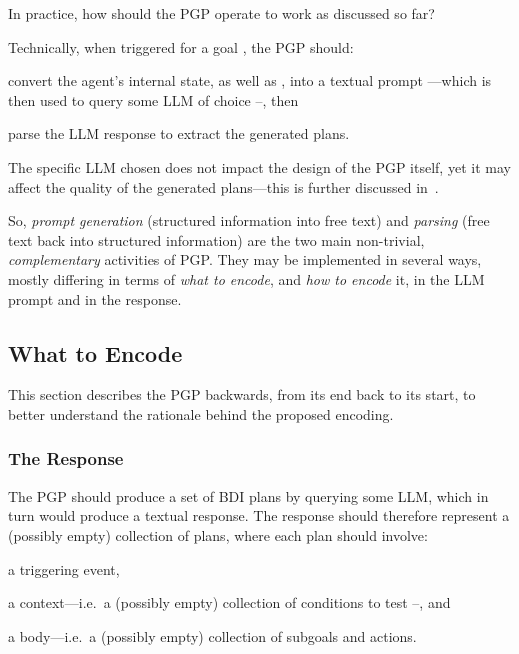 \documentclass[12pt,a4paper,openright,twoside]{book}
\begin{document}
In practice, how should the \ac{PGP} operate to work as discussed so far?

Technically, when triggered for a goal , the \ac{PGP} should:
%
\begin{inlinelist}
    \item convert the agent's internal state, as well as , into a textual prompt
   ---which is then used to query some \ac{LLM} of choice --,
    then
    \item parse the \ac{LLM} response to extract the generated plans.
\end{inlinelist}
%
The specific \ac{LLM} chosen does not impact the design of the \ac{PGP} itself, yet it may affect the quality of the generated plans---this is further discussed in~.

So, \emph{prompt generation} (structured information into free text) and  \emph{parsing} (free text back into structured information) are the two main non-trivial, \emph{complementary} activities of \ac{PGP}.
%
They may be implemented in several ways, mostly differing in terms of \emph{what to encode}, and \emph{how to encode} it, in the \ac{LLM} prompt and in the response.

\subsection{What to Encode}\label{sec:pgp-encoding}

This section describes the \ac{PGP} backwards, from its end back to its start, to better understand the rationale behind the proposed encoding.

\subsubsection{The Response}
%
The \ac{PGP} should produce a set of \ac{BDI} plans by querying some \ac{LLM},
which in turn would produce a textual response.
%
The response should therefore represent a (possibly empty) collection of plans,
where each plan should involve:
%
\begin{inlinelist}
    \item a triggering event,
    \item a context---i.e.\ a (possibly empty) collection of conditions to test --, and
    \item a body---i.e.\ a (possibly empty) collection of subgoals and actions.
\end{inlinelist}
\end{document}
